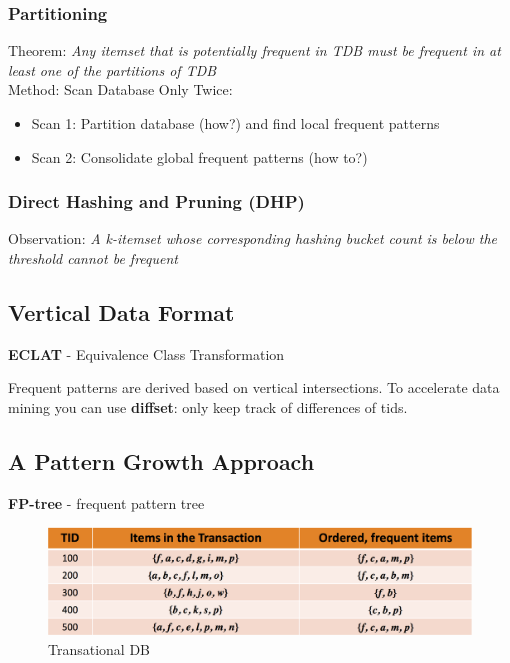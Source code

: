 \subsubsection{Partitioning}
Theorem: \textit{Any itemset that is potentially frequent in TDB must be frequent in at least one of the partitions of TDB}\\

Method: Scan Database Only Twice:
\begin{itemize}
\item Scan 1: Partition database (how?) and find local frequent patterns
\item Scan 2: Consolidate global frequent patterns (how to?)
\end{itemize}

\subsubsection{Direct Hashing and Pruning (DHP)}
Observation: \textit{A k-itemset whose corresponding hashing bucket count is below the threshold cannot be frequent}

\subsection{Vertical Data Format}\label{eclat}
\textbf{ECLAT} - Equivalence Class Transformation

Frequent patterns are derived based on vertical intersections. To accelerate data mining you can use \textbf{diffset}: only keep track of differences of tids.

\subsection{A Pattern Growth Approach}\label{fpgrowth}
\textbf{FP-tree} - frequent pattern tree

\begin{figure}[h!]
    \centering
    \includegraphics[width=\linewidth]{transactional_db.png}
    \caption{Transational DB}
\end{figure}

